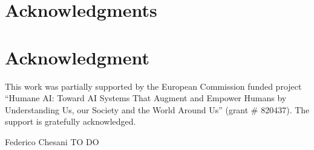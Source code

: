\documentclass[10pt,journal,compsoc]{IEEEtran}
\theoremstyle{definition}
\theoremstyle{plain}
\begin{document}


%




%




\ifCLASSOPTIONcompsoc
  \section*{Acknowledgments}
\else
  \section*{Acknowledgment}
\fi

This work was partially supported by the European Commission funded project ``Humane AI: Toward AI Systems That Augment and Empower Humans by Understanding Us, our Society and the World Around Us'' (grant \# 820437). The support is gratefully acknowledged.








\begin{IEEEbiography}{Federico Chesani}
TO DO
\end{IEEEbiography}
\end{document}
